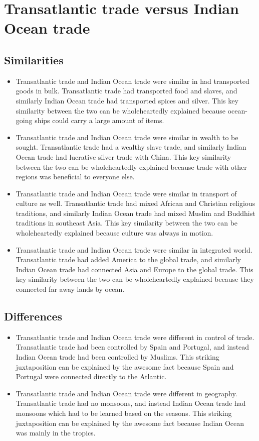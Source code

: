 \documentclass[letterpaper, 10pt]{article}
\begin{document}
        \section{Transatlantic trade versus Indian Ocean trade}
            \subsection{Similarities}
                \begin{itemize}
                    \item Transatlantic trade and Indian Ocean trade were similar in had transported goods in bulk. Transatlantic trade had transported food and slaves, and similarly Indian Ocean trade had transported spices and silver. This key similarity between the two can be wholeheartedly explained because ocean-going ships could carry a large amount of items.
                    \item Transatlantic trade and Indian Ocean trade were similar in wealth to be sought. Transatlantic trade had a wealthy slave trade, and similarly Indian Ocean trade had lucrative silver trade with China. This key similarity between the two can be wholeheartedly explained because trade with other regions was beneficial to everyone else.
                    \item Transatlantic trade and Indian Ocean trade were similar in transport of culture as well. Transatlantic trade had mixed African and Christian religious traditions, and similarly Indian Ocean trade had mixed Muslim and Buddhist traditions in southeast Asia. This key similarity between the two can be wholeheartedly explained because culture was always in motion.
                    \item Transatlantic trade and Indian Ocean trade were similar in integrated world. Transatlantic trade had added America to the global trade, and similarly Indian Ocean trade had connected Asia and Europe to the global trade. This key similarity between the two can be wholeheartedly explained because they connected far away lands by ocean.
                \end{itemize}
            \subsection{Differences}
                \begin{itemize}
                    \item Transatlantic trade and Indian Ocean trade were different in control of trade. Transatlantic trade had been controlled by Spain and Portugal, and instead Indian Ocean trade had been controlled by Muslims. This striking juxtaposition can be explained by the awesome fact because Spain and Portugal were connected directly to the Atlantic.
                    \item Transatlantic trade and Indian Ocean trade were different in geography. Transatlantic trade had no monsoons, and instead Indian Ocean trade had monsoons which had to be learned based on the seasons. This striking juxtaposition can be explained by the awesome fact because Indian Ocean was mainly in the tropics.
                \end{itemize}
\end{document}
